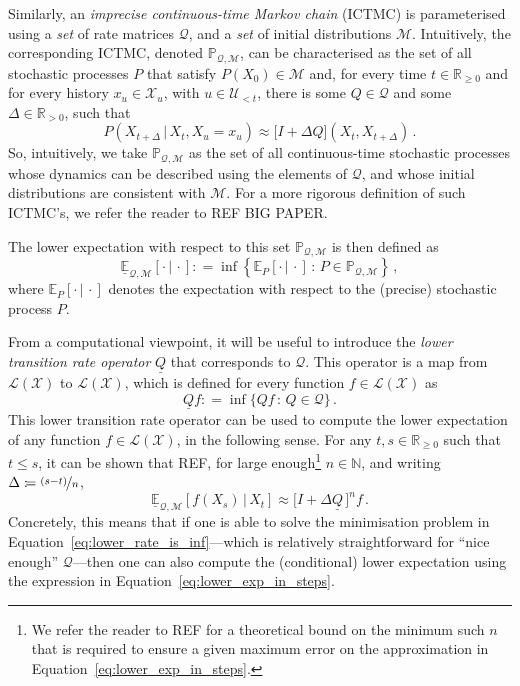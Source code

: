 \documentclass[twoside,11pt]{article}
\newcommand{\nats}{\mathbb{N}}
\newcommand{\reals}{\mathbb{R}}
\newcommand{\realspos}{\reals_{>0}}
\newcommand{\realsnonneg}{\reals_{\geq 0}}
\newcommand{\states}{\mathcal{X}}
\newcommand{\gambles}{\mathcal{L}}
\newcommand{\gamblesX}{\gambles(\states)}
\newcommand{\rateset}{\mathcal{Q}}
\newcommand{\lrate}{\underline{Q}}
\newcommand{\coloneqq}{:\!=}
\begin{document}
Similarly, an \emph{imprecise continuous-time Markov chain} (ICTMC) is parameterised using a \emph{set} of rate matrices $\rateset$, and a \emph{set} of initial distributions $\mathcal{M}$. Intuitively, the corresponding ICTMC, denoted $\mathbb{P}_{\rateset,\mathcal{M}}$, can be characterised as the set of all stochastic processes $P$ that satisfy $P(X_0)\in\mathcal{M}$ and, for every time $t\in\realsnonneg$ and for every history $x_u\in\states_u$, with $u\in\mathcal{U}_{<t}$, there is some $Q\in\rateset$ and some $\Delta\in\realspos$, such that
\begin{equation*}
P(X_{t+\Delta}\,\vert\,X_t,X_u=x_u) \approx \bigl[I + \Delta Q\bigr](X_t, X_{t+\Delta})\,.
\end{equation*}
So, intuitively, we take $\mathbb{P}_{\rateset,\mathcal{M}}$ as the set of all continuous-time stochastic processes whose dynamics can be described using the elements of $\rateset$, and whose initial distributions are consistent with $\mathcal{M}$. For a more rigorous definition of such ICTMC's, we refer the reader to REF BIG PAPER.

The lower expectation with respect to this set $\mathbb{P}_{\rateset,\mathcal{M}}$ is then defined as
\begin{equation*}
\underline{\mathbb{E}}_{\rateset,\mathcal{M}}[\cdot\,\vert\,\cdot] \coloneqq \inf\left\{ \mathbb{E}_P[\cdot\,\vert\,\cdot]\,:\, P\in\mathbb{P}_{\rateset,\mathcal{M}} \right\}\,,
\end{equation*}
where $\mathbb{E}_P[\cdot\,\vert\,\cdot]$ denotes the expectation with respect to the (precise) stochastic process $P$.

From a computational viewpoint, it will be useful to introduce the \emph{lower transition rate operator} $\lrate$ that corresponds to $\rateset$. This operator is a map from $\gamblesX$ to $\gamblesX$, which is defined for every function $f\in\gamblesX$ as
\begin{equation}\label{eq:lower_rate_is_inf}
\lrate f \coloneqq \inf\{ Qf\,:\, Q\in\rateset \}\,.
\end{equation}
This lower transition rate operator can be used to compute the lower expectation of any function $f\in\gamblesX$, in the following sense. For any $t,s\in\realsnonneg$ such that $t\leq s$, it can be shown that REF, for large enough\footnote{We refer the reader to REF for a theoretical bound on the minimum such $n$ that is required to ensure a given maximum error on the approximation in Equation~\eqref{eq:lower_exp_in_steps}.} $n\in\nats$, and writing $\Delta\coloneqq \nicefrac{(s-t)}{n}$,
\begin{equation}\label{eq:lower_exp_in_steps}
\underline{\mathbb{E}}_{\rateset,\mathcal{M}}[f(X_s)\,\vert\,X_t] \approx \bigl[I + \Delta\lrate\,\bigr]^nf\,.
\end{equation}
Concretely, this means that if one is able to solve the minimisation problem in Equation~\eqref{eq:lower_rate_is_inf}---which is relatively straightforward for ``nice enough'' $\rateset$---then one can also compute the (conditional) lower expectation using the expression in Equation~\ref{eq:lower_exp_in_steps}.
\end{document}
